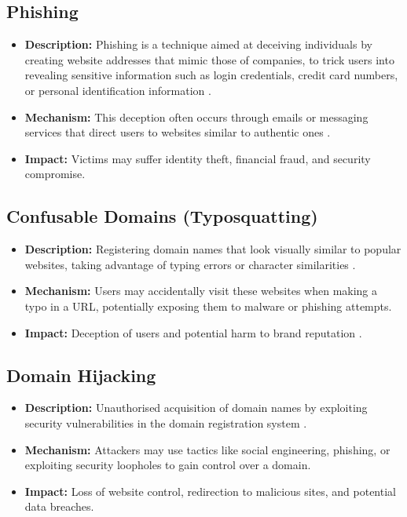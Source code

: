 \subsection{Phishing}
\begin{itemize}
    \item \textbf{Description:} Phishing is a technique aimed at deceiving individuals by creating website addresses that mimic those of companies, to trick users into revealing sensitive information such as login credentials, credit card numbers, or personal identification information \cite{webinarcare2023dnsstats}.
    \item \textbf{Mechanism:} This deception often occurs through emails or messaging services that direct users to websites similar to authentic ones \cite{jakobsson2006phishing}.
    \item \textbf{Impact:} Victims may suffer identity theft, financial fraud, and security compromise.
\end{itemize}

\subsection{Confusable Domains (Typosquatting)}
\begin{itemize}
    \item \textbf{Description:} Registering domain names that look visually similar to popular websites, taking advantage of typing errors or character similarities \cite{inta2023dnstypo}.
    \item \textbf{Mechanism:} Users may accidentally visit these websites when making a typo in a URL, potentially exposing them to malware or phishing attempts.
    \item \textbf{Impact:} Deception of users and potential harm to brand reputation \cite{edelman2008typosquatting}.
\end{itemize}

\subsection{Domain Hijacking}
\begin{itemize}
    \item \textbf{Description:} Unauthorised acquisition of domain names by exploiting security vulnerabilities in the domain registration system \cite{inta2023dnstypo}.
    \item \textbf{Mechanism:} Attackers may use tactics like social engineering, phishing, or exploiting security loopholes to gain control over a domain.
    \item \textbf{Impact:} Loss of website control, redirection to malicious sites, and potential data breaches.
\end{itemize}

